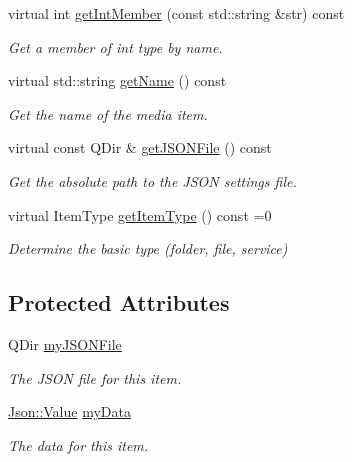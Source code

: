 \begin{DoxyCompactItemize}
virtual int \hyperlink{class_a_w_e_media_item_a00edc2e2c1f6070d03b26ee2a0484caa}{get\-Int\-Member} (const std\-::string \&str) const 
\begin{DoxyCompactList}\small\item\em Get a member of {\ttfamily int} type by name. \end{DoxyCompactList}\item 
virtual std\-::string \hyperlink{class_a_w_e_media_item_abd6896ce4df5a91c4517a8f36c92dd87}{get\-Name} () const 
\begin{DoxyCompactList}\small\item\em Get the name of the media item. \end{DoxyCompactList}\item 
virtual const Q\-Dir \& \hyperlink{class_a_w_e_media_item_ac36b959b2491f9eb0ab0c48e7b64f3ee}{get\-J\-S\-O\-N\-File} () const 
\begin{DoxyCompactList}\small\item\em Get the absolute path to the J\-S\-O\-N settings file. \end{DoxyCompactList}\item 
virtual Item\-Type \hyperlink{class_a_w_e_media_item_a8b267bd03e4a49b605455d9cd1f03938}{get\-Item\-Type} () const =0
\begin{DoxyCompactList}\small\item\em Determine the basic type (folder, file, service) \end{DoxyCompactList}\end{DoxyCompactItemize}
\subsection*{Protected Attributes}
\begin{DoxyCompactItemize}
\item 
\hypertarget{class_a_w_e_media_item_ab960046626189680b808d6103f83ddf7}{Q\-Dir \hyperlink{class_a_w_e_media_item_ab960046626189680b808d6103f83ddf7}{my\-J\-S\-O\-N\-File}}\label{class_a_w_e_media_item_ab960046626189680b808d6103f83ddf7}

\begin{DoxyCompactList}\small\item\em The J\-S\-O\-N file for this item. \end{DoxyCompactList}\item 
\hypertarget{class_a_w_e_media_item_a3ce686d92d593fe0144ba4b8fac7e8c7}{\hyperlink{class_json_1_1_value}{Json\-::\-Value} \hyperlink{class_a_w_e_media_item_a3ce686d92d593fe0144ba4b8fac7e8c7}{my\-Data}}\label{class_a_w_e_media_item_a3ce686d92d593fe0144ba4b8fac7e8c7}

\begin{DoxyCompactList}\small\item\em The data for this item. \end{DoxyCompactList}\end{DoxyCompactItemize}


